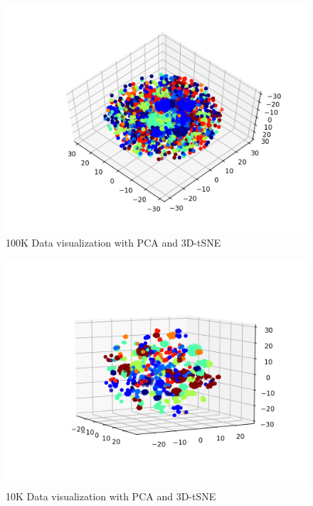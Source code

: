 \documentclass[10pt,twocolumn,letterpaper]{article}
\begin{document}
\begin{figure}
\includegraphics[scale=0.5]{100k-tsne.png}
\caption{100K Data visualization with PCA and 3D-tSNE}
\end{figure}

\begin{figure}
\includegraphics[scale=0.5]{10k-tsne.png}
\caption{10K Data visualization with PCA and 3D-tSNE}
\end{figure}
\end{document}
